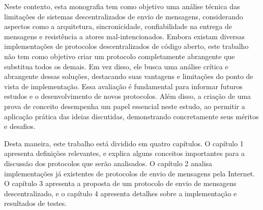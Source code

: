Neste contexto, esta monografia tem como objetivo uma análise técnica das limitações de sistemas descentralizados de envio de mensagens, considerando aspectos como a arquitetura, sincronicidade, confiabilidade na entrega de mensagens e resistência a atores mal-intencionados. Embora existam diversas implementações de protocolos descentralizados de código aberto, este trabalho não tem como objetivo criar um protocolo completamente abrangente que substitua todos os demais. Em vez disso, ele busca uma análise crítica e abrangente dessas soluções, destacando suas vantagens e limitações do ponto de vista de implementação. Essa avaliação é fundamental para informar futuros estudos e o desenvolvimento de novos protocolos. Além disso, a criação de uma prova de conceito desempenha um papel essencial neste estudo, ao permitir a aplicação prática das ideias discutidas, demonstrando concretamente seus méritos e desafios.

Desta maneira, este trabalho está dividido em quatro capítulos. O capítulo 1 apresenta definições relevantes, e explica alguns conceitos importantes para a discussão dos protocolos que serão analisados. O capítulo 2 analisa implementações já existentes de protocolos de envio de mensagens pela Internet. O capítulo 3 apresenta a proposta de um protocolo de envio de mensagens descentralizado, e o capítulo 4 apresenta detalhes sobre a implementação e resultados de testes.